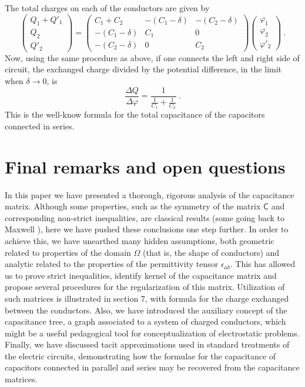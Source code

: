 \documentclass[12pt]{iopart}
\newcommand{\be}{\begin{equation}}
\newcommand{\ee}{\end{equation}}
\newcommand{\mx}[1]{\bm{\mathsf{#1}}}
\newcommand{\0}{\vct{0}}
\theoremstyle{plain} \newtheorem{tm}{Theorem}[section]
\theoremstyle{plain} \newtheorem{lm}[tm]{Lemma}
\theoremstyle{definition} \newtheorem{defn}[tm]{Definition}
\begin{document}
\noindent
The total charges on each of the conductors are given by
\be
\begin{pmatrix} Q_1 + Q'_1 \\ Q_2 \\ Q'_2 \end{pmatrix} = \begin{pmatrix} C_1 + C_2 & -(C_1 - \delta) & -(C_2 - \delta) \\ -(C_1 - \delta) & C_1 & 0 \\ -(C_2 - \delta) & 0 & C_2 \end{pmatrix} \begin{pmatrix} \varphi_1 \\ \varphi_2 \\ \varphi'_2 \end{pmatrix} \ .
\ee
Now, using the same procedure as above, if one connects the left and right side of circuit, the exchanged charge divided by the potential difference, in the limit when $\delta \to 0$, is
\be
\frac{\Delta Q}{\Delta\varphi} = \frac{1}{\displaystyle{\frac{1}{C_1} + \frac{1}{C_2}}} \ .
\ee
This is the well-know formula for the total capacitance of the capacitors connected in series. 

\bigskip







\section{Final remarks and open questions} %

In this paper we have presented a thorough, rigorous analysis of the capacitance matrix. Although some properties, such as the symmetry of the matrix $\mx{C}$ and corresponding non-strict inequalities, are classical results (some going back to Maxwell \cite{Maxwell}), here we have pushed these conclusions one step further. In order to achieve this, we have unearthed many hidden assumptions, both geometric related to properties of the domain $\Omega$ (that is, the shape of conductors) and analytic related to the properties of the permittivity tensor $\epsilon_{ab}$. This has allowed us to prove strict inequalities, identify kernel of the capacitance matrix and propose several procedures for the regularization of this matrix. Utilization of such matrices is illustrated in section 7, with formula for the charge exchanged between the conductors. Also, we have introduced the auxiliary concept of the capacitance tree, a graph associated to a system of charged conductors, which might be a useful pedagogical tool for conceptualization of electrostatic problems. Finally, we have discussed tacit approximations used in standard treatments of the electric circuits, demonstrating how the formulae for the capacitance of capacitors connected in parallel and series may be recovered from the capacitance matrices.
\end{document}

